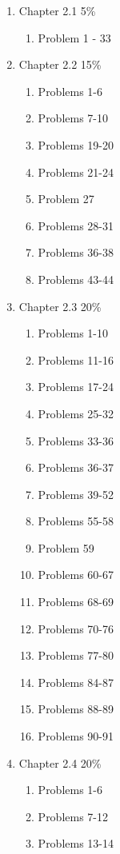 \documentclass[11pt]{article}
\begin{document}
	\begin{multicols}{2}
		
	\begin{enumerate}
		\item Chapter 2.1 5\%
			\begin{enumerate}[-]
				\item Problem 1 - 33
			\end{enumerate}
		\item Chapter 2.2 15\%
		\begin{enumerate}[-]
			\item Problems 1-6
			\item Problems 7-10
			\item Problems 19-20
			\item Problems 21-24
			\item Problem 27
			\item Problems 28-31
			\item Problems 36-38
			\item Problems 43-44
		\end{enumerate}
		\item Chapter 2.3 20\%
		\begin{enumerate}[-] 
			\item Problems 1-10
			\item Problems 11-16
			\item Problems 17-24
			\item Problems 25-32
			\item Problems 33-36
			\item Problems 36-37
			\item Problems 39-52
			\item Problems 55-58
			\item Problem 59
			\item Problems 60-67
			\item Problems 68-69
			\item Problems 70-76
			\item Problems 77-80
			\item Problems 84-87
			\item Problems 88-89
			\item Problems 90-91
		\end{enumerate}
		\item Chapter 2.4 20\%
		\begin{enumerate}[-]
			\item Problems 1-6
			\item Problems 7-12
			\item Problems 13-14

\end{enumerate}
\end{enumerate}
\end{multicols}
\end{document}
